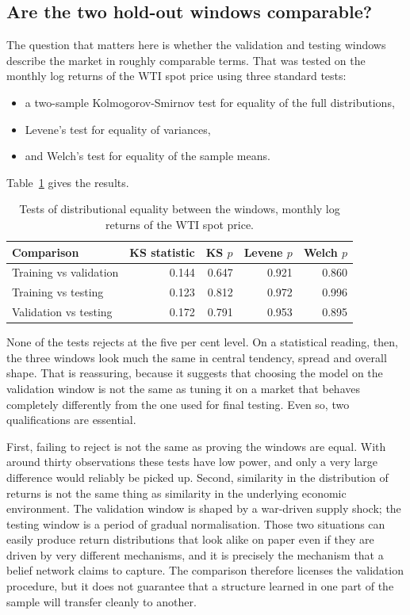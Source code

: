 \documentclass[11pt,a4paper]{article}
\begin{document}
\subsection{Are the two hold-out windows comparable?}

The question that matters here is whether the validation and testing windows describe the market
in roughly comparable terms. That was tested on the monthly log returns of the WTI spot price
using three standard tests:
\begin{itemize}
    \item a two-sample Kolmogorov-Smirnov test for equality of the full distributions,
    \item Levene's test for equality of variances,
    \item and Welch's test for equality of the sample means.
\end{itemize}
Table~\ref{tab:ks} gives the results.

\begin{table}[H]
\centering
\caption{Tests of distributional equality between the windows, monthly log returns of the WTI spot
price.}
\label{tab:ks}
\begin{tabular}{@{}lrrrr@{}}
\toprule
\textbf{Comparison} & \textbf{KS statistic} & \textbf{KS $p$} & \textbf{Levene $p$} &
\textbf{Welch $p$} \\
\midrule
Training vs validation & 0.144 & 0.647 & 0.921 & 0.860 \\
Training vs testing    & 0.123 & 0.812 & 0.972 & 0.996 \\
Validation vs testing  & 0.172 & 0.791 & 0.953 & 0.895 \\
\bottomrule
\end{tabular}
\end{table}

None of the tests rejects at the five per cent level. On a statistical reading, then, the three
windows look much the same in central tendency, spread and overall shape. That is reassuring,
because it suggests that choosing the model on the validation window is not the same as tuning it
on a market that behaves completely differently from the one used for final testing. Even so, two
qualifications are essential.

First, failing to reject is not the same as proving the windows are equal. With around thirty
observations these tests have low power, and only a very large difference would reliably be
picked up. Second, similarity in the distribution of returns is not the same thing as similarity
in the underlying economic environment. The validation window is shaped by a war-driven supply
shock; the testing window is a period of gradual normalisation. Those two situations can easily
produce return distributions that look alike on paper even if they are driven by very different
mechanisms, and it is precisely the mechanism that a belief network claims to capture. The
comparison therefore licenses the validation procedure, but it does not guarantee that a
structure learned in one part of the sample will transfer cleanly to another.
\end{document}
